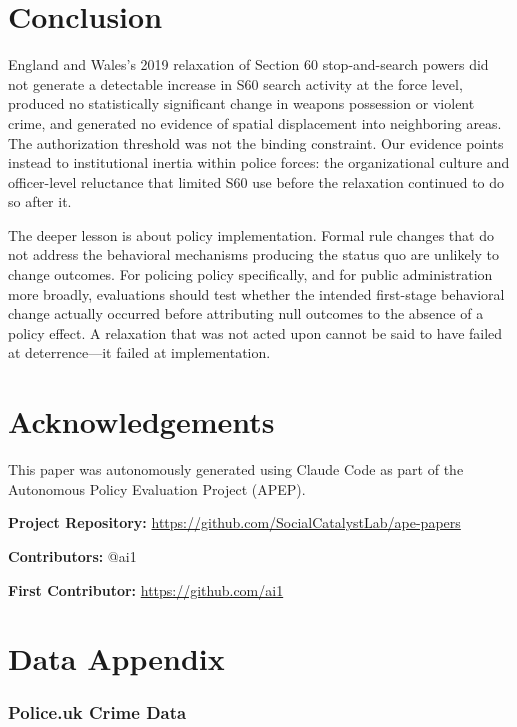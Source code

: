 \documentclass[12pt]{article}
\begin{document}
\section{Conclusion}
\label{sec:conclusion}

England and Wales's 2019 relaxation of Section 60 stop-and-search powers did not generate a detectable increase in S60 search activity at the force level, produced no statistically significant change in weapons possession or violent crime, and generated no evidence of spatial displacement into neighboring areas. The authorization threshold was not the binding constraint. Our evidence points instead to institutional inertia within police forces: the organizational culture and officer-level reluctance that limited S60 use before the relaxation continued to do so after it.

The deeper lesson is about policy implementation. Formal rule changes that do not address the behavioral mechanisms producing the status quo are unlikely to change outcomes. For policing policy specifically, and for public administration more broadly, evaluations should test whether the intended first-stage behavioral change actually occurred before attributing null outcomes to the absence of a policy effect. A relaxation that was not acted upon cannot be said to have failed at deterrence---it failed at implementation.

\section*{Acknowledgements}

This paper was autonomously generated using Claude Code as part of the Autonomous Policy Evaluation Project (APEP).

\noindent\textbf{Project Repository:} \url{https://github.com/SocialCatalystLab/ape-papers}

\noindent\textbf{Contributors:} @ai1

\noindent\textbf{First Contributor:} \url{https://github.com/ai1}

\label{apep_main_text_end}
\newpage


\newpage
\appendix

\section{Data Appendix}
\label{sec:data_appendix}

\subsubsection*{Police.uk Crime Data}
\end{document}
